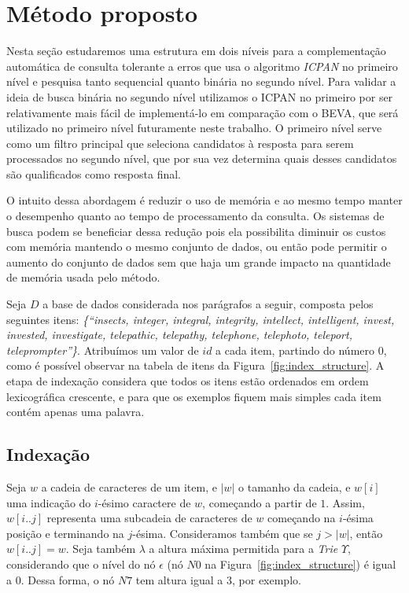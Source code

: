 \section{Método proposto} \label{sec:metodo}

Nesta seção estudaremos uma estrutura em dois níveis para a complementação automática de consulta tolerante a erros que usa o algoritmo \textit{ICPAN} no primeiro nível e pesquisa tanto sequencial quanto binária no segundo nível. Para validar a ideia de busca binária no segundo nível utilizamos o ICPAN no primeiro por ser relativamente mais fácil de implementá-lo em comparação com o BEVA, que será utilizado no primeiro nível futuramente neste trabalho. O primeiro nível serve como um filtro principal que seleciona candidatos à resposta para serem processados no segundo nível, que por sua vez determina quais desses candidatos são qualificados como resposta final.

O intuito dessa abordagem é reduzir o uso de memória e ao mesmo tempo manter o desempenho quanto ao tempo de processamento da consulta. Os sistemas de busca podem se beneficiar dessa redução pois ela possibilita diminuir os custos com memória mantendo o mesmo conjunto de dados, ou então pode permitir o aumento do conjunto de dados sem que haja um grande impacto na quantidade de memória usada pelo método.

Seja $D$ a base de dados considerada nos parágrafos a seguir, composta pelos seguintes itens: \textit{\{``insects, integer, integral, integrity, intellect, intelligent, invest, invested, investigate, telepathic, telepathy, telephone, telephoto, teleport, teleprompter''\}}. Atribuímos um valor de $id$ a cada item, partindo do número $0$, como é possível observar na tabela de itens da Figura~\ref{fig:index_structure}. A etapa de indexação considera que todos os itens estão ordenados em ordem lexicográfica crescente, e para que os exemplos fiquem mais simples cada item contém apenas uma palavra.
 
\subsection{Indexação} 
\label{sec:indexing}
Seja $w$ a cadeia de caracteres de um item, e $|w|$ o tamanho da cadeia, e $w[i]$ uma indicação do $i$-ésimo caractere de $w$, começando a partir de $1$. Assim, $w[i..j]$ representa uma subcadeia de caracteres de $w$ começando na $i$-ésima posição e terminando na $j$-ésima. Consideramos também que se $j > |w|$, então $w[i..j] = w$. Seja também $\lambda$ a altura máxima permitida para a \textit{Trie} $\Upsilon$, considerando que o nível do nó $\epsilon$ (nó $N0$ na Figura~\ref{fig:index_structure}) é igual a $0$. Dessa forma, o nó $N7$ tem altura igual a $3$, por exemplo. 

